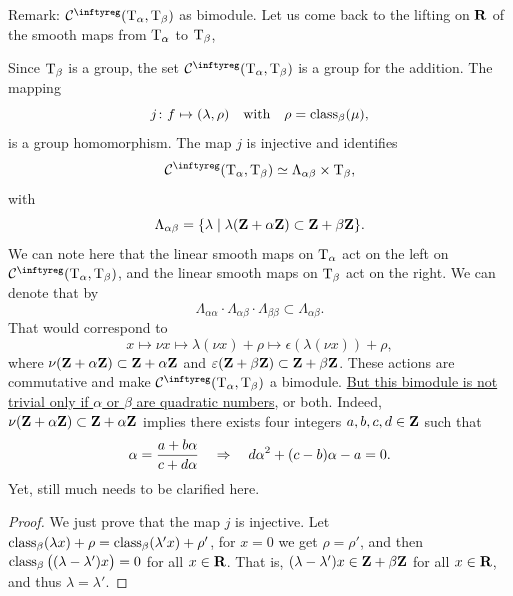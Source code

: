 \begin{Article}{Remark: $\Cinfty(\Torus_\alpha,\Torus_\beta)$ as bimodule.}{}
  Let us come back to the lifting on $\mathbf{R}$ of the smooth maps from $\mathrm{T}_\alpha$ to $\mathrm{T}_\beta$,
  \begin{center}
  \end{center}
  Since $\mathrm{T}_\beta$ is a group,
  the set $\Cinfty(\Torus_\alpha,\Torus_\beta)$ is a group for the addition.
  The mapping
  $$%
    j \colon f \mapsto (\lambda, \rho)
    \quad \text{with} \quad
    \rho = \Class_\beta(\mu),
    $$%
  is a group homomorphism.
  The map $j$ is injective and identifies
  $$%
    \Cinfty(\Torus_\alpha,\Torus_\beta) \simeq \Lambda_{\alpha\beta} \times \Torus_\beta,
    $$%
  with
  $$%
    \Lambda_{\alpha \beta} = \{ \lambda  \mid \lambda(\ZZ + \alpha \ZZ) \subset \ZZ + \beta \ZZ \}.
    $$%
  We can note here that the linear smooth maps on $\mathrm{T}_\alpha$ act on the left on $\Cinfty(\Torus_\alpha,\Torus_\beta)$,
  and the linear smooth maps on $\mathrm{T}_\beta$ act on the right.
  We can denote that by
  $$%
    \Lambda_{\alpha\alpha} \cdot \Lambda_{\alpha\beta} \cdot \Lambda_{\beta\beta} \subset \Lambda_{\alpha\beta}.
    $$%
  That would correspond to
  $$%
    x \mapsto \nu x \mapsto \lambda(\nu x) + \rho \mapsto \epsilon(\lambda(\nu x)) + \rho,
    $$%
  where $\nu(\mathbf{Z} + \alpha \mathbf{Z}) \subset \mathbf{Z} + \alpha \mathbf{Z}$ and $\varepsilon(\mathbf{Z} + \beta \mathbf{Z}) \subset \mathbf{Z} + \beta \mathbf{Z}$.
  These actions are commutative and make $\Cinfty(\Torus_\alpha,\Torus_\beta)$ a bimodule.
  \uline{But this bimodule is not trivial only if $\alpha$ or $\beta$ are quadratic numbers},
  or both.
  Indeed,
  $\nu(\mathbf{Z} + \alpha \mathbf{Z}) \subset \mathbf{Z} + \alpha \mathbf{Z}$ implies there exists four integers $a,b,c,d \in \mathbf{Z}$ such that
  $$%
    \alpha = {a + b \alpha \over c + d \alpha}
    \quad \Rightarrow \quad
    d\alpha^2 + (c-b)\alpha -a =0.
    $$%
  Yet,
  still much needs to be clarified here.
\end{Article}

\begin{proof}
  We just prove that the map $j$ is injective.
  Let $\operatorname{class}_\beta(\lambda x) + \rho = \operatorname{class}_\beta(\lambda' x) + \rho'$,
  for $x=0$ we get $\rho = \rho'$, and then $\operatorname{class}_\beta\big((\lambda - \lambda') x\big) = 0$ for all $x \in \mathbf{R}$.
  That is,
  $(\lambda - \lambda') x \in \mathbf{Z} + \beta \mathbf{Z}$ for all $x \in \mathbf{R}$,
  and thus $\lambda = \lambda'$.
\end{proof}

